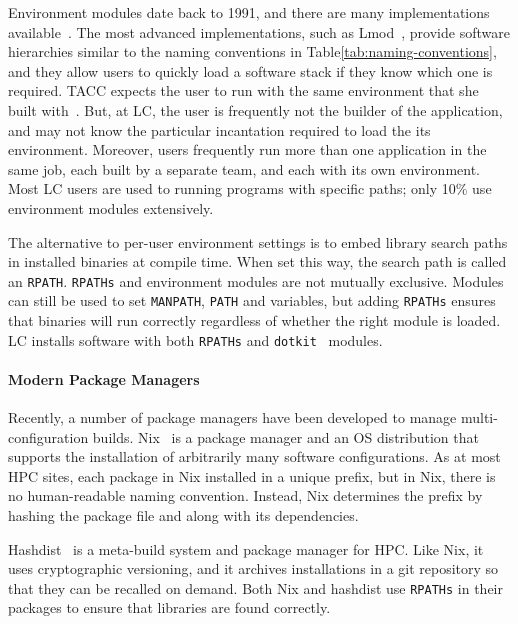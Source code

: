 Environment modules date back to 1991, and there are many implementations 
available~\cite{dotkit,furlani+:lisa91,furlani+:lisa96,mclay:lmod,mclay:lmod-tutorial}.
The most advanced implementations, such as Lmod~\cite{mclay:lmod,mclay:lmod-tutorial},
provide software hierarchies similar to the naming conventions in 
Table\ref{tab:naming-conventions}, and they allow users to quickly load a software stack
if they know which one is required.  TACC expects the user to run with the same
environment that she built with~\cite{mclay:lmod-tutorial}.  But, at LC, the user is
frequently not the builder of the application, and may not know the particular
incantation required to load the its environment. Moreover, users frequently run more 
than one application in the same job, each built by a separate team, and each with
its own environment. Most LC users are used to running programs with
specific paths; only 10\% use environment modules extensively.

The alternative to per-user environment settings is to embed library search paths
in installed binaries at compile time. When set this way, the search path is called
an {\tt RPATH}. {\tt RPATHs} and environment modules are not mutually exclusive.
Modules can still be used to set {\tt MANPATH}, {\tt PATH} and variables, but
adding {\tt RPATHs} ensures that binaries will run correctly regardless of whether
the right module is loaded. LC installs software with both {\tt RPATHs} and
{\tt dotkit}~\cite{dotkit} modules.

\paragraph{Modern Package Managers}

Recently, a number of package managers have been developed to manage 
multi-configuration builds.
%
Nix~\cite{dolstra+:icfp08,dolstra+:lisa04}
is a package manager and an OS distribution that supports the installation of
arbitrarily many software configurations.  As at most HPC sites, each package
in Nix installed in a unique prefix, but in Nix, there is no human-readable
naming convention.  Instead, Nix determines the prefix by hashing the package
file and along with its dependencies.

Hashdist~\cite{hashdist} is a meta-build system and package manager for HPC.
Like Nix, it uses cryptographic versioning, and it archives installations
in a git repository so that they can be recalled on demand. 
%
Both Nix and hashdist use {\tt RPATHs} in their packages to ensure that
libraries are found correctly. 

